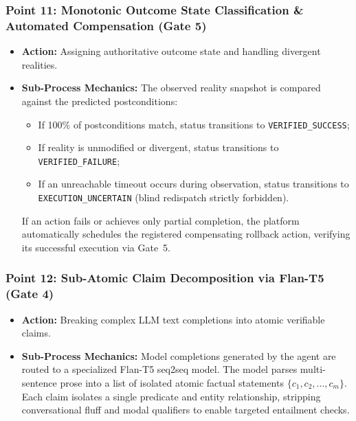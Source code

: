 \documentclass[11pt,a4paper]{article}
\begin{document}
\subsubsection*{Point 11: Monotonic Outcome State Classification \& Automated Compensation (Gate 5)}
\begin{itemize}[leftmargin=*,itemsep=1pt]
  \item \textbf{Action:} Assigning authoritative outcome state and handling divergent realities.
  \item \textbf{Sub-Process Mechanics:} The observed reality snapshot is compared against the predicted postconditions:
    \begin{itemize}[leftmargin=*,itemsep=1pt]
      \item If 100\% of postconditions match, status transitions to \texttt{VERIFIED\_SUCCESS};
      \item If reality is unmodified or divergent, status transitions to \texttt{VERIFIED\_FAILURE};
      \item If an unreachable timeout occurs during observation, status transitions to \texttt{EXECUTION\_UNCERTAIN} (blind redispatch strictly forbidden).
    \end{itemize}
  If an action fails or achieves only partial completion, the platform automatically schedules the registered compensating rollback action, verifying its successful execution via Gate~5.
\end{itemize}

\subsubsection*{Point 12: Sub-Atomic Claim Decomposition via Flan-T5 (Gate 4)}
\begin{itemize}[leftmargin=*,itemsep=1pt]
  \item \textbf{Action:} Breaking complex LLM text completions into atomic verifiable claims.
  \item \textbf{Sub-Process Mechanics:} Model completions generated by the agent are routed to a specialized Flan-T5 seq2seq model. The model parses multi-sentence prose into a list of isolated atomic factual statements $\{c_1, c_2, \dots, c_m\}$. Each claim isolates a single predicate and entity relationship, stripping conversational fluff and modal qualifiers to enable targeted entailment checks.
\end{itemize}
\end{document}
